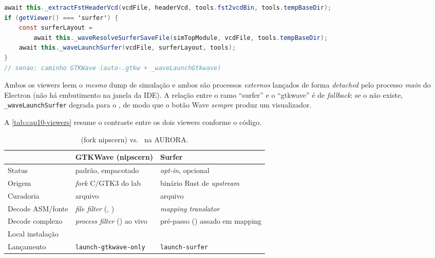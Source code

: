 \begin{lstlisting}[language=Java,caption={Ramo do visualizador no passo Wave (compilation\_module.js).}]
await this._extractFstHeaderVcd(vcdFile, headerVcd, tools.fst2vcdBin, tools.tempBaseDir);
if (getViewer() === 'surfer') {
    const surferLayout =
        await this._waveResolveSurferSaveFile(simTopModule, vcdFile, tools.tempBaseDir);
    await this._waveLaunchSurfer(vcdFile, surferLayout, tools);
}
// senao: caminho GTKWave (auto-.gtkw + _waveLaunchGtkwave)
\end{lstlisting}

\begin{nota}
Ambos os viewers leem o \emph{mesmo} dump de simulação e ambos são processos
\emph{externos} lançados de forma \emph{detached} pelo processo \emph{main} do
Electron (não há embutimento na janela da IDE). A relação entre o ramo
\enquote{surfer} e o \enquote{gtkwave} é de \emph{fallback}: se o 
não existe, \lstinline|_waveLaunchSurfer| degrada para o , de modo que
o botão Wave \emph{sempre} produz um visualizador.
\end{nota}

A \autoref{tab:cap10-viewers} resume o contraste entre os dois viewers conforme o
código.

\begin{table}[h]
\centering
\caption{ (fork nipscern) vs.\  na AURORA.}
\label{tab:cap10-viewers}
\begin{tabularx}{\linewidth}{l Y Y}
\toprule
 & \textbf{GTKWave (nipscern)} & \textbf{Surfer} \\
\midrule
Status     & padrão, empacotado          & \emph{opt-in}, opcional      \\
Origem     & \emph{fork} C/GTK3 do lab   & binário Rust de \emph{upstream} \\
Curadoria  & arquivo         & arquivo      \\
Decode ASM/fonte & \emph{file filter} (, ) & \emph{mapping translator} \\
Decode complexo & \emph{process filter} () ao vivo & pré-passo () assado em mapping \\
Local instalação &  &  \\
Lançamento & \lstinline|launch-gtkwave-only| & \lstinline|launch-surfer| \\
\bottomrule
\end{tabularx}
\end{table}

